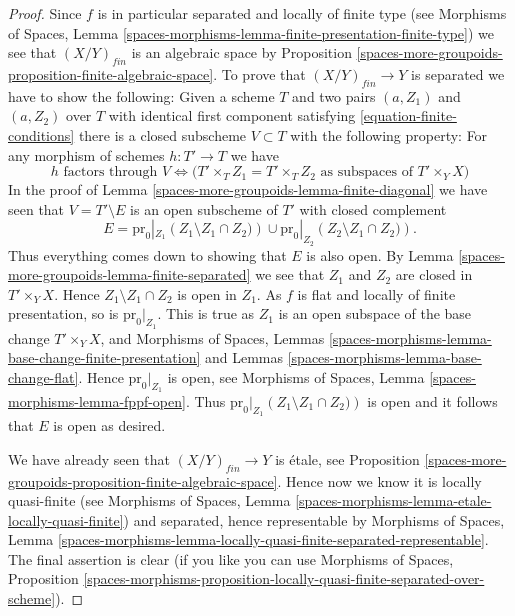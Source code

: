 \begin{proof}
Since $f$ is in particular separated and locally of finite type (see
Morphisms of Spaces,
Lemma \ref{spaces-morphisms-lemma-finite-presentation-finite-type})
we see that $(X/Y)_{fin}$ is an algebraic space by
Proposition \ref{spaces-more-groupoids-proposition-finite-algebraic-space}.
To prove that $(X/Y)_{fin} \to Y$ is separated we have to show
the following: Given a scheme $T$ and two pairs $(a, Z_1)$ and $(a, Z_2)$
over $T$
with identical first component satisfying \ref{equation-finite-conditions}
there is a closed subscheme $V \subset T$ with the following
property: For any morphism of schemes $h : T' \to T$ we have
$$
h \text{ factors through } V \Leftrightarrow
\Big(T' \times_T Z_1 = T' \times_T Z_2
\text{ as subspaces of }T' \times_Y X\Big)
$$
In the proof of
Lemma \ref{spaces-more-groupoids-lemma-finite-diagonal}
we have seen that $V = T' \setminus E$ is an open subscheme of $T'$
with closed complement
$$
E =
\text{pr}_0|_{Z_1}\left(Z_1 \setminus Z_1 \cap Z_2)\right)
\cup
\text{pr}_0|_{Z_2}\left(Z_2 \setminus Z_1 \cap Z_2)\right).
$$
Thus everything comes down to showing that $E$ is also open. By
Lemma \ref{spaces-more-groupoids-lemma-finite-separated}
we see that $Z_1$ and $Z_2$ are closed in $T' \times_Y X$. Hence
$Z_1 \setminus Z_1 \cap Z_2$ is open in $Z_1$. As $f$ is flat and
locally of finite presentation, so is $\text{pr}_0|_{Z_1}$.
This is true as $Z_1$ is an open subspace of the base change
$T' \times_Y X$, and
Morphisms of Spaces,
Lemmas \ref{spaces-morphisms-lemma-base-change-finite-presentation} and
Lemmas \ref{spaces-morphisms-lemma-base-change-flat}.
Hence $\text{pr}_0|_{Z_1}$ is open, see
Morphisms of Spaces, Lemma \ref{spaces-morphisms-lemma-fppf-open}.
Thus $\text{pr}_0|_{Z_1}\left(Z_1 \setminus Z_1 \cap Z_2)\right)$ is
open and it follows that $E$ is open as desired.

\medskip\noindent
We have already seen that $(X/Y)_{fin} \to Y$ is \'etale, see
Proposition \ref{spaces-more-groupoids-proposition-finite-algebraic-space}.
Hence now we know it is locally quasi-finite (see
Morphisms of Spaces,
Lemma \ref{spaces-morphisms-lemma-etale-locally-quasi-finite})
and separated, hence representable by
Morphisms of Spaces, Lemma
\ref{spaces-morphisms-lemma-locally-quasi-finite-separated-representable}.
The final assertion is clear (if you like you can use
Morphisms of Spaces, Proposition
\ref{spaces-morphisms-proposition-locally-quasi-finite-separated-over-scheme}).
\end{proof}

